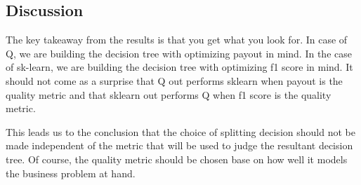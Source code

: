 \subsection{Discussion}

The key takeaway from the results is that you get what you look for. In case of
Q, we are building the decision tree with optimizing payout in mind. In the case
of sk-learn, we are building the decision tree with optimizing f1 score in mind.
It should not come as a surprise that Q out performs sklearn when payout is the
quality metric and that sklearn out performs Q when f1 score is the quality
metric.

This leads us to the conclusion that the choice of splitting decision 
should not be made independent of the metric that will be used to judge the
resultant decision tree. Of course, the quality metric should be chosen
base on how well it models the business problem at hand.




